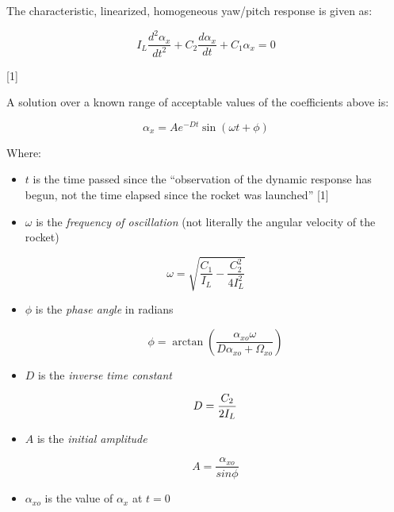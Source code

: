 \documentclass[]{article}
\providecommand{\tightlist}{%
  \setlength{\itemsep}{0pt}\setlength{\parskip}{0pt}}
\begin{document}
The characteristic, linearized, homogeneous yaw/pitch response is given
as:

\begin{equation}
I_L \dfrac{d^2 \alpha_x}{dt^2} + C_2 \dfrac{d \alpha_x}{dt} + C_1 \alpha_x = 0
\end{equation}

{[}1{]}

A solution over a known range of acceptable values of the coefficients
above is:

\begin{equation}
\label{eq_yaw_pitch_time_response}
\alpha_x = A e^{-Dt} \sin(\omega t + \phi)
\end{equation}

Where:

\begin{itemize}
\tightlist
\item
  \(t\) is the time passed since the ``observation of the dynamic
  response has begun, not the time elapsed since the rocket was
  launched'' {[}1{]}
\item
  \(\omega\) is the \emph{frequency of oscillation} (not literally the
  angular velocity of the rocket)
\end{itemize}

\begin{equation}
\label{eq_frequency_oscillation}
\omega = \sqrt{ \dfrac{C_1}{I_L} - \dfrac{C_2^2}{4 I_L^2} }
\end{equation}

\begin{itemize}
\tightlist
\item
  \(\phi\) is the \emph{phase angle} in radians

  \begin{equation}
  \label{eq_phase}
  \phi = 
  \arctan { 
  \left( \dfrac{ \alpha_{xo} \omega } { D\alpha_{xo} + \Omega_{xo} } \right) 
  }
  \end{equation}
\item
  \(D\) is the \emph{inverse time constant}

  \begin{equation}
  \label{eq_inverse_time_constant}
  D = { C_2 \over 2 I_L }
  \end{equation}
\item
  \(A\) is the \emph{initial amplitude}

  \begin{equation}
  A = \dfrac{\alpha_{xo}}{sin \phi}
  \end{equation}
\item
  \(\alpha_{xo}\) is the value of \(\alpha_x\) at \(t=0\)
\end{itemize}
\end{document}
